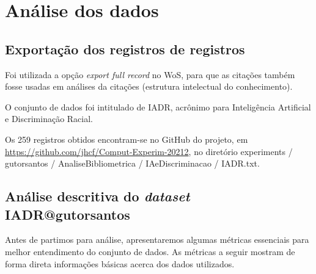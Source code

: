 \section{Análise dos dados}

\subsection{Exportação dos registros de registros}
Foi utilizada a opção \textit{export full record} no WoS, para que as citações também fosse usadas em análises da citações (estrutura intelectual do conhecimento). 

O conjunto de dados foi intitulado de IADR, acrônimo para Inteligência Artificial e Discriminação Racial.

Os 259 registros obtidos encontram-se no GitHub do projeto, em \url{https://github.com/jhcf/Comput-Experim-20212}, no diretório { experiments / gutorsantos / AnaliseBibliometrica / IAeDiscriminacao / IADR.txt}. 

\subsection{Análise descritiva do \textit{dataset} IADR@gutorsantos}

Antes de partimos para análise, apresentaremos algumas métricas essenciais para melhor entendimento do conjunto de dados. As métricas a seguir mostram de forma direta informações básicas acerca dos dados utilizados.


\newcommand\startYearIADR{1994}
\newcommand\finalYearIADR{2022}
\newcommand\totalReferencesIADR{12.496}
\newcommand\totalKWPlusIADR{625}
\newcommand\totalKWAuthorIADR{791}
\newcommand\totalAuthors{1.210}
\newcommand\totalDocuments{259}
\newcommand\totalSource{217}

